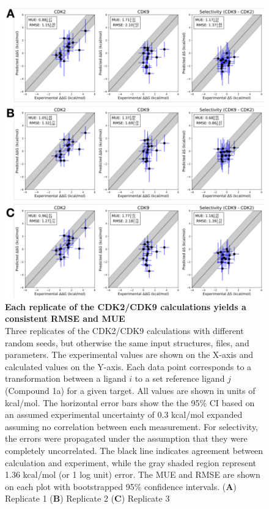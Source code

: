 \documentclass[phd,tocprelim]{cornell}
\begin{document}
\begin{appendices}
	\begin{landscape}
		\begin{figure}[p]
			\centering
			\includegraphics[width=0.46\linewidth]{figures/supp_figure4.pdf}
			\caption[Each replicate of the CDK2/CDK9 calculations yields a consistent RMSE and MUE]{
{\bf Each replicate of the CDK2/CDK9 calculations yields a consistent RMSE and MUE} \\
Three replicates of the CDK2/CDK9 calculations with different random seeds, but otherwise the same input structures, files, and parameters. The experimental values are shown on the X-axis and calculated values on the Y-axis. Each data point corresponds to a transformation between a ligand $i$ to a set reference ligand $j$ (Compound 1a) for a given target. All values are shown in units of kcal/mol. The horizontal error bars show the the 95\% CI based on an assumed experimental uncertainty of 0.3 kcal/mol\citep{BROWN2009420} expanded assuming no correlation between each measurement. For selectivity, the errors were propagated under the assumption that they were completely uncorrelated. The black line indicates agreement between calculation and experiment, while the gray shaded region represent 1.36 kcal/mol (or 1 log unit) error. The MUE and RMSE are shown on each plot with bootstrapped 95$\%$ confidence intervals. ({\bf A}) Replicate 1 ({\bf B}) Replicate 2 ({\bf C}) Replicate 3}
			\label{fig:sup-figure-4}
		\end{figure}
	\end{landscape}
	

\end{appendices}
\end{document}
